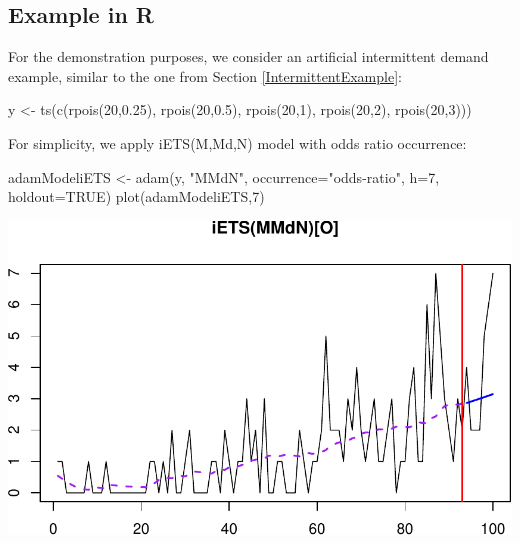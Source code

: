 \documentclass[
]{book}
\newenvironment{Shaded}{\begin{snugshade}}{\end{snugshade}}
\newcommand{\AttributeTok}[1]{\textcolor[rgb]{0.77,0.63,0.00}{#1}}
\newcommand{\ConstantTok}[1]{\textcolor[rgb]{0.00,0.00,0.00}{#1}}
\newcommand{\DecValTok}[1]{\textcolor[rgb]{0.00,0.00,0.81}{#1}}
\newcommand{\FloatTok}[1]{\textcolor[rgb]{0.00,0.00,0.81}{#1}}
\newcommand{\FunctionTok}[1]{\textcolor[rgb]{0.00,0.00,0.00}{#1}}
\newcommand{\NormalTok}[1]{#1}
\newcommand{\OtherTok}[1]{\textcolor[rgb]{0.56,0.35,0.01}{#1}}
\newcommand{\StringTok}[1]{\textcolor[rgb]{0.31,0.60,0.02}{#1}}
\theoremstyle{definition}
\theoremstyle{definition}
\theoremstyle{definition}
\theoremstyle{definition}
\theoremstyle{remark}
\begin{document}
\hypertarget{forecastingADAMOtherExample}{%
\subsection{Example in R}\label{forecastingADAMOtherExample}}

For the demonstration purposes, we consider an artificial intermittent demand example, similar to the one from Section \ref{IntermittentExample}:

\begin{Shaded}
\begin{Highlighting}[]
\NormalTok{y }\OtherTok{\textless{}{-}} \FunctionTok{ts}\NormalTok{(}\FunctionTok{c}\NormalTok{(}\FunctionTok{rpois}\NormalTok{(}\DecValTok{20}\NormalTok{,}\FloatTok{0.25}\NormalTok{), }\FunctionTok{rpois}\NormalTok{(}\DecValTok{20}\NormalTok{,}\FloatTok{0.5}\NormalTok{), }\FunctionTok{rpois}\NormalTok{(}\DecValTok{20}\NormalTok{,}\DecValTok{1}\NormalTok{),}
          \FunctionTok{rpois}\NormalTok{(}\DecValTok{20}\NormalTok{,}\DecValTok{2}\NormalTok{), }\FunctionTok{rpois}\NormalTok{(}\DecValTok{20}\NormalTok{,}\DecValTok{3}\NormalTok{)))}
\end{Highlighting}
\end{Shaded}

For simplicity, we apply iETS(M,Md,N) model with odds ratio occurrence:

\begin{Shaded}
\begin{Highlighting}[]
\NormalTok{adamModeliETS }\OtherTok{\textless{}{-}} \FunctionTok{adam}\NormalTok{(y, }\StringTok{"MMdN"}\NormalTok{, }\AttributeTok{occurrence=}\StringTok{"odds{-}ratio"}\NormalTok{,}
                      \AttributeTok{h=}\DecValTok{7}\NormalTok{, }\AttributeTok{holdout=}\ConstantTok{TRUE}\NormalTok{)}
\FunctionTok{plot}\NormalTok{(adamModeliETS,}\DecValTok{7}\NormalTok{)}
\end{Highlighting}
\end{Shaded}

\includegraphics{adam_files/figure-latex/unnamed-chunk-203-1.pdf}
\end{document}
